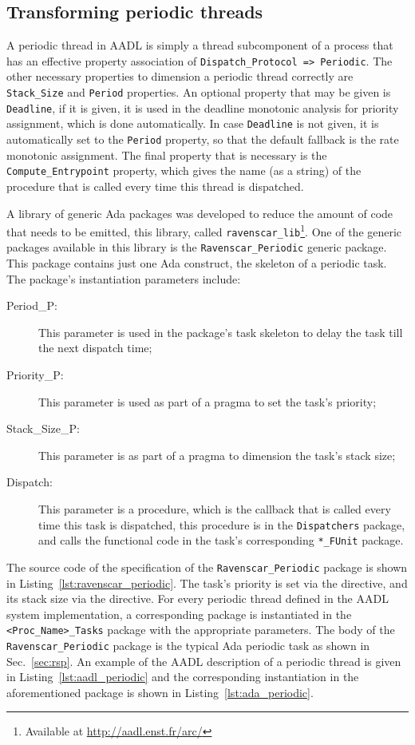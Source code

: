 \subsection{Transforming periodic threads}
A periodic thread in AADL is simply a thread subcomponent of a process
that has an effective property association of
\texttt{Dispatch\_Protocol => Periodic}. The other necessary
properties to dimension a periodic thread correctly are
\texttt{Stack\_Size} and \texttt{Period} properties. An optional
property that may be given is \texttt{Deadline}, if it is given, it is
used in the deadline monotonic analysis for priority assignment, which
is done automatically. In case \texttt{Deadline} is not given, it is
automatically set to the \texttt{Period} property, so that the default
fallback is the rate monotonic assignment. The final property that is
necessary is the \texttt{Compute\_Entrypoint} property, which gives
the name (as a string) of the procedure that is called every time this
thread is dispatched.

A library of generic Ada packages was developed to reduce the amount
of code that needs to be emitted, this library, called
\texttt{ravenscar\_lib}\footnote{Available at
  \url{http://aadl.enst.fr/arc/}}. One of the generic packages
available in this library is the \texttt{Ravenscar\_Periodic} generic
package. This package contains just one Ada construct, the skeleton of
a periodic task. The package's instantiation parameters include:

\begin{description}
\item[Period\_P:]{This parameter is used in the package's task
  skeleton to delay the task till the next dispatch time;}
\item[Priority\_P:]{This parameter is used as part of a pragma to set
  the task's priority;}
\item[Stack\_Size\_P:]{This parameter is as part of a pragma to
  dimension the task's stack size;}
\item[Dispatch:]{This parameter is a procedure, which is the callback
  that is called every time this task is dispatched, this procedure is
  in the \texttt{Dispatchers} package, and calls the functional code
  in the task's corresponding \texttt{*\_FUnit} package.}
\end{description}

The source code of the specification of the
\texttt{Ravenscar\_Periodic} package is shown in
Listing~\ref{lst:ravenscar_periodic}. The task's priority is set via
the  directive, and its stack size via the
 directive. For every periodic thread defined
in the AADL system implementation, a corresponding package is
instantiated in the \texttt{<Proc\_Name>\_Tasks} package with the
appropriate parameters. The body of the \texttt{Ravenscar\_Periodic}
package is the typical Ada periodic task as shown in
Sec.~\ref{sec:rsp}. An example of the AADL description of a periodic
thread is given in Listing~\ref{lst:aadl_periodic} and the
corresponding instantiation in the aforementioned package is shown in
Listing~\ref{lst:ada_periodic}.

